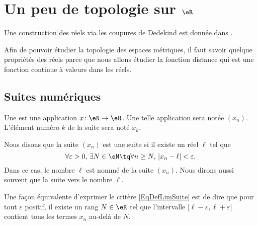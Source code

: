 \section{Un peu de topologie sur $\eR$}

Une construction des réels via les coupures de Dedekind est donnée dans \cite{PaulinTopGmVegN}.

Afin de pouvoir étudier la topologie des espaces métriques, il faut savoir quelque propriétés des réels parce que nous allons étudier la fonction distance qui est une fonction continue à valeurs dans les réels.

\subsection{Suites numériques}

Une  est une application $x\colon \eN\to \eR$. Une telle application sera notée $(x_n)$. L'élément numéro $k$ de la suite sera noté $x_k$.

\begin{definition}	\label{DefLimiteSuiteNum}
	Nous disons que la suite $(x_n)$ est une suite  si il existe un réel $\ell$ tel que
	\begin{equation}		\label{EqDefLimSuite}
		\forall \varepsilon>0,\,\exists N\in\eN\tq\forall n\geq N,\,| x_n-\ell |<\varepsilon.
	\end{equation}
	Dans ce cas, le nombre $\ell$ est nommé  de la suite $(x_n)$. Nous dirons aussi souvent que la suite  vers le nombre $\ell$.
\end{definition}
	Une façon équivalente d'exprimer le critère \eqref{EqDefLimSuite} est de dire que pour tout $\varepsilon$ positif, il existe un rang $N\in\eR$ tel que l'intervalle $\mathopen[ \ell-\varepsilon , \ell+\varepsilon \mathclose]$ contient tous les termes $x_n$ au-delà de $N$.

